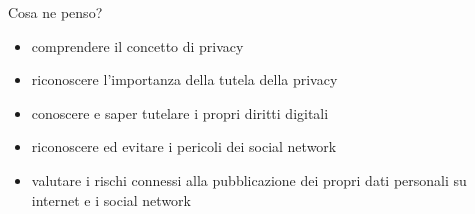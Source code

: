 \documentclass[italian]{beamer}
\begin{document}
\begin{frame}{Cosa ne penso?}
	\begin{itemize}
		\item comprendere il concetto di privacy
		\item riconoscere l'importanza della tutela della privacy
		\item conoscere e saper tutelare i propri diritti digitali
		\item riconoscere ed evitare i pericoli dei social network
		\item valutare i rischi connessi alla pubblicazione dei propri dati personali su internet e i social network
	\end{itemize}		
\end{frame}
\end{document}
